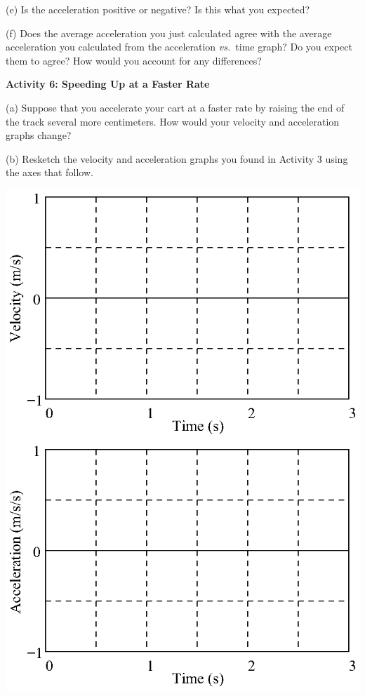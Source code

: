\pagebreak[2]
(e) Is the acceleration positive or negative? Is this what you expected? 
\answerspace{15mm}

(f) Does the average acceleration you just calculated agree with the average
acceleration you calculated from the acceleration \textit{vs.}~time graph? Do you expect them to agree? How would you account for any differences? 
\answerspace{20mm}

\textbf{Activity 6: Speeding Up at a Faster Rate} 

(a) Suppose that you accelerate your cart at a faster rate by raising the end of the track several more centimeters. How would your velocity and acceleration graphs change? 
\answerspace{15mm}

(b) Resketch the velocity and acceleration graphs you found in Activity 3 using
the axes that follow.

\vspace{-0.3cm}
{\par\centering \includegraphics{changing/changing_fig5.eps} \par}
\vspace{-0.3cm}

